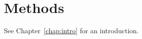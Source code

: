 \chapter{Methods\label{chap:methods}}

See Chapter~\ref{chap:intro} for an introduction.
\lipsum[81]

\lipsum[36-70]
